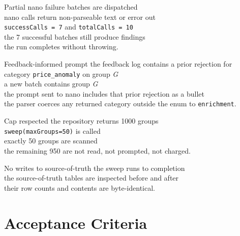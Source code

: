 \begin{scenario}{Partial nano failure}
 batches are dispatched \\
 nano calls return non-parseable text or error out \\
\Then \texttt{successCalls = 7} and \texttt{totalCalls = 10} \\
\And the 7 successful batches still produce findings \\
\And the run completes without throwing.
\end{scenario}

\begin{scenario}{Feedback-informed prompt}
\Given the feedback log contains a prior rejection for category \texttt{price\_anomaly} on group \emph{G} \\
\When a new batch contains group \emph{G} \\
\Then the prompt sent to nano includes that prior rejection as a bullet \\
\And the parser coerces any returned category outside the enum to \texttt{enrichment}.
\end{scenario}

\begin{scenario}{Cap respected}
\Given the repository returns 1000 groups \\
\When \texttt{sweep(maxGroups=50)} is called \\
\Then exactly 50 groups are scanned \\
\And the remaining 950 are not read, not prompted, not charged.
\end{scenario}

\begin{scenario}{No writes to source-of-truth}
\Given the sweep runs to completion \\
\When the source-of-truth tables are inspected before and after \\
\Then their row counts and contents are byte-identical.
\end{scenario}

\section{Acceptance Criteria}

